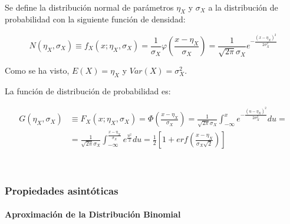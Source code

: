 \documentclass[11pt]{article}
\begin{document}
    \begin{center}
    \end{center}
    { \hspace*{\fill} \\}
    
    Se define la distribución normal de parámetros \(\eta_X\) y \(\sigma_X\)
a la distribución de probabilidad con la siguiente función de densidad:

\[N(\eta_X, \sigma_X)\equiv f_X(x;\eta_X, \sigma_X) = \frac{1}{\sigma_X}\varphi(\frac{x-\eta_X}{\sigma_X})= \frac{1}{\sqrt{2\pi}\sigma_X}e^{-\frac{(x-\eta_X)^2}{2\sigma_X^2}}\]

Como se ha visto, \(E(X)=\eta_X\) y \(Var(X)=\sigma_X^2\).

La función de distribución de probabilidad es:

\begin{align*}
G(\eta_X, \sigma_X)&\equiv F_X(x; \eta_X, \sigma_X) = \Phi(\frac{x-\eta_X}{\sigma_X}) = \frac{1}{\sqrt{2\pi}\sigma_X}\int_{-\infty}^x  e^{-\frac{(u-\eta_X)^2}{2\sigma_X^2}} du=\\
&= \frac{1}{\sqrt{2\pi}\sigma_X}\int_{-\infty}^{\frac{x-\eta_X}{\sigma_X}}  e^{\frac{u^2}{2}} du= \frac{1}{2}\left[1 + erf(\frac{x-\eta_X}{\sigma_X\sqrt{2}}) \right]
\end{align*}

    \begin{center}
    \end{center}
    { \hspace*{\fill} \\}
    
    \hypertarget{propiedades-asintuxf3ticas}{%
\subsubsection*{Propiedades
asintóticas}\label{propiedades-asintuxf3ticas}}

\hypertarget{aproximaciuxf3n-de-la-distribuciuxf3n-binomial}{%
\paragraph{Aproximación de la Distribución
Binomial}\label{aproximaciuxf3n-de-la-distribuciuxf3n-binomial}}
\end{document}
